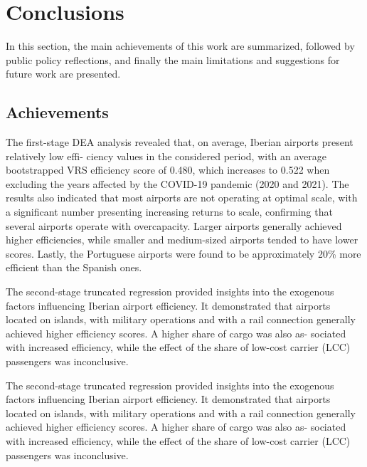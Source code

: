 \clearpage
\section{Conclusions}
\label{sec:concl}
In this section, the main achievements of this work are summarized, followed by public policy reflections, and finally the main limitations and suggestions for future work are presented.
\subsection{Achievements}

The first-stage DEA analysis revealed that, on average, Iberian airports present relatively low effi-
ciency values in the considered period, with an average bootstrapped VRS efficiency score of 0.480, which increases to 0.522 when excluding the years affected by the COVID-19 pandemic (2020 and
2021). The results also indicated that most airports are not operating at optimal scale, with a significant
number presenting increasing returns to scale, confirming that several airports operate with overcapacity. Larger airports generally achieved higher efficiencies, while smaller and medium-sized
airports tended to have lower scores. Lastly, the Portuguese airports were found to be approximately
20\% more efficient than the Spanish ones.

The second-stage truncated regression provided insights into the exogenous factors influencing
Iberian airport efficiency. It demonstrated that airports located on islands, with military operations and
with a rail connection generally achieved higher efficiency scores. A higher share of cargo was also as-
sociated with increased efficiency, while the effect of the share of low-cost carrier (LCC) passengers was
inconclusive.

The second-stage truncated regression provided insights into the exogenous factors influencing
Iberian airport efficiency. It demonstrated that airports located on islands, with military operations and
with a rail connection generally achieved higher efficiency scores. A higher share of cargo was also as-
sociated with increased efficiency, while the effect of the share of low-cost carrier (LCC) passengers was
inconclusive.


